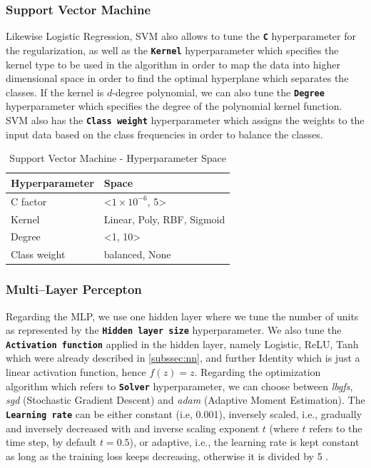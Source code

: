 \subsubsection{Support Vector Machine}
Likewise Logistic Regression, SVM also allows to tune the \textbf{\texttt{C}} hyperparameter for the regularization, as well as the \textbf{\texttt{Kernel}} hyperparameter which specifies the kernel type to be used in the algorithm in order to map the data into higher dimensional space in order to find the optimal hyperplane which separates the classes.
If the kernel is $d$-degree polynomial, we can also tune the \textbf{\texttt{Degree}} hyperparameter which specifies the degree of the polynomial kernel function.
SVM also has the \textbf{\texttt{Class weight}} hyperparameter which assigns the weights to the input data based on the class frequencies in order to balance the classes.


\begin{table}[H]
\small
\setlength{\tabcolsep}{8pt}
\renewcommand{\arraystretch}{1.3}
\centering
    \caption[Support Vector Machine - Hyperparameter Space]{Support Vector Machine - Hyperparameter Space}\label{tab:svmspace}
    \begin{tabular}{ll}
\toprule
\textbf{Hyperparameter} & \textbf{Space}\\
\midrule
\hline
C factor & <$1\times 10^{-6}$, 5> \\
Kernel & Linear, Poly, RBF, Sigmoid \\
Degree & <1, 10> \\
Class weight & balanced, None \\
\hline
\bottomrule
\end{tabular}
\vspace{0.7em}

\vspace{-1em}
\end{table}


\subsubsection{Multi--Layer Percepton}
Regarding the MLP, we use one hidden layer where we tune the number of units as represented by the \textbf{\texttt{Hidden layer size}} hyperparameter.
We also tune the \textbf{\texttt{Activation function}} applied in the hidden layer, namely Logistic, ReLU, Tanh which were already described in \autoref{subssec:nn}, and further Identity which is just a linear activation function, hence $f(z) = z$.
Regarding the optimization algorithm which refers to \textbf{\texttt{Solver}} hyperparameter, we can choose between \textit{lbgfs}, \textit{sgd} (Stochastic Gradient Descent) and \textit{adam} (Adaptive Moment Estimation).
The \textbf{\texttt{Learning rate}} can be either constant (i.e, 0.001), inversely scaled, i.e., gradually and inversely decreased with and inverse scaling exponent $t$ (where $t$ refers to the time step, by default $t=0.5$), or adaptive, i.e., the learning rate is kept constant as long as the training loss keeps decreasing, otherwise it is divided by 5 \citep{scikit-mlp}.

